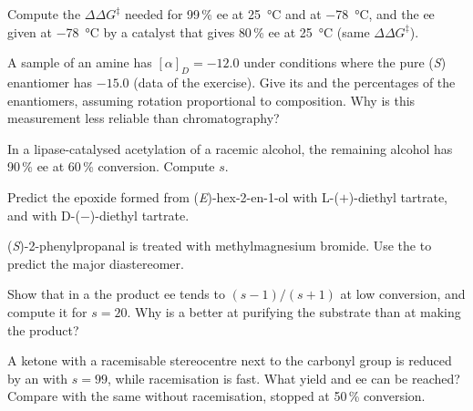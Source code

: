 \begin{exercise}[$\star\star$]\label{exo:b3:asymmetric-synthesis:5}
Compute the $\Delta\Delta G^\ddagger$ needed for 99\,\% ee at \qty{25}{\celsius} and at \qty{-78}{\celsius}, and the ee given at \qty{-78}{\celsius}
by a catalyst that gives 80\,\% ee at \qty{25}{\celsius} (same $\Delta\Delta G^\ddagger$).
\end{exercise}

\begin{exercise}[$\star\star$]\label{exo:b3:asymmetric-synthesis:6}
A sample of an amine has $[\alpha]_D = -12.0$ under conditions where the pure (\textit{S})
enantiomer has $-15.0$ (data of the exercise). Give its  and the
percentages of the enantiomers, assuming rotation proportional to composition.
Why is this measurement less reliable than chromatography?
\end{exercise}

\begin{exercise}[$\star\star$]\label{exo:b3:asymmetric-synthesis:7}
In a lipase-catalysed acetylation of a racemic alcohol, the remaining alcohol
has 90\,\% ee at 60\,\% conversion. Compute $s$.
\end{exercise}

\begin{exercise}[$\star\star$]\label{exo:b3:asymmetric-synthesis:8}
Predict the epoxide formed from (\textit{E})-hex-2-en-1-ol with L-($+$)-diethyl tartrate, and with
D-($-$)-diethyl tartrate.
\end{exercise}

\begin{exercise}[$\star\star$]\label{exo:b3:asymmetric-synthesis:9}
(\textit{S})-2-phenylpropanal is treated with methylmagnesium bromide. Use the  to predict the major diastereomer.
\end{exercise}

\begin{exercise}[$\star\star\star$]\label{exo:b3:asymmetric-synthesis:10}
Show that in a  the product ee tends to $(s - 1)/(s + 1)$ at low
conversion, and compute it for $s = 20$. Why is a  better at purifying
the substrate than at making the product?
\end{exercise}

\begin{exercise}[$\star\star\star$]\label{exo:b3:asymmetric-synthesis:11}
A ketone with a racemisable stereocentre next to the carbonyl group is reduced by
an  with $s = 99$, while racemisation is fast. What yield and ee can be
reached? Compare with the same  without racemisation, stopped at 50\,\%
conversion.
\end{exercise}

